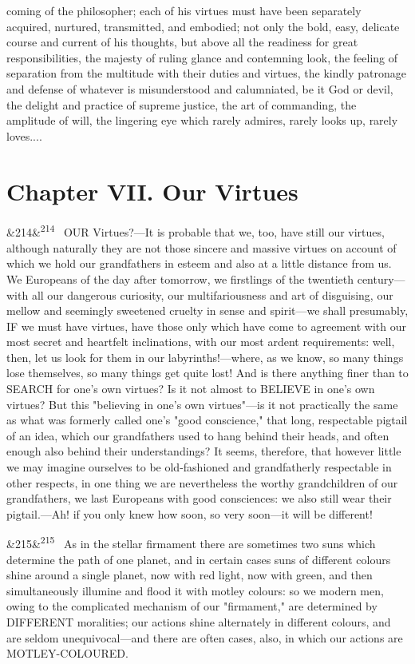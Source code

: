 \documentclass[12pt]{article}
\newcommand{\para}[1][]{\par\noindent\ifx&#1&\else\textsuperscript{\footnotesize #1}~\fi}
\begin{document}
coming of the philosopher; each of his virtues must have been separately acquired, nurtured, transmitted, and embodied; not only the bold, easy, delicate course and current of his thoughts, but above all the readiness for great responsibilities, the majesty of ruling glance and contemning look, the feeling of separation from the multitude with their duties and virtues, the kindly patronage and defense of whatever is misunderstood and calumniated, be it God or devil, the delight and practice of supreme justice, the art of commanding, the amplitude of will, the lingering eye which rarely admires, rarely looks up, rarely loves....

\section*{Chapter VII. Our Virtues}

\para[214] OUR Virtues?---It is probable that we, too, have still our virtues, although naturally they are not those sincere and massive virtues on account of which we hold our grandfathers in esteem and also at a little distance from us. We Europeans of the day after tomorrow, we firstlings of the twentieth century---with all our dangerous curiosity, our multifariousness and art of disguising, our mellow and seemingly sweetened cruelty in sense and spirit---we shall presumably, IF we must have virtues, have those only which have come to agreement with our most secret and heartfelt inclinations, with our most ardent requirements: well, then, let us look for them in our labyrinths!---where, as we know, so many things lose themselves, so many things get quite lost! And is there anything finer than to SEARCH for one's own virtues? Is it not almost to BELIEVE in one's own virtues? But this "believing in one's own virtues"---is it not practically the same as what was formerly called one's "good conscience," that long, respectable pigtail of an idea, which our grandfathers used to hang behind their heads, and often enough also behind their understandings? It seems, therefore, that however little we may imagine ourselves to be old-fashioned and grandfatherly respectable in other respects, in one thing we are nevertheless the worthy grandchildren of our grandfathers, we last Europeans with good consciences: we also still wear their pigtail.---Ah! if you only knew how soon, so very soon---it will be different!

\para[215] As in the stellar firmament there are sometimes two suns which determine the path of one planet, and in certain cases suns of different colours shine around a single planet, now with red light, now with green, and then simultaneously illumine and flood it with motley colours: so we modern men, owing to the complicated mechanism of our "firmament," are determined by DIFFERENT moralities; our actions shine alternately in different colours, and are seldom unequivocal---and there are often cases, also, in which our actions are MOTLEY-COLOURED.
\end{document}
